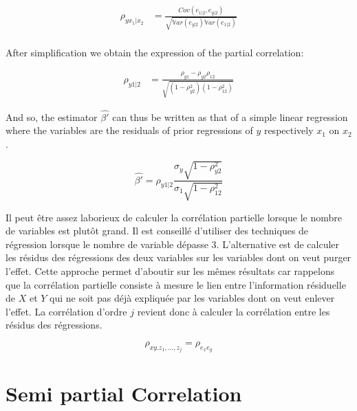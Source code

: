 \documentclass[
]{report}
\begin{document}
\begin{align*}
\rho_{yx_1|x_2}&=\frac{Cov(e_{1|2},e_{y|2})}{\sqrt{\mathbb{V}ar(e_{y|2})\mathbb{V}ar(e_{1|2})}}\\
\end{align*}

After simplification we obtain the expression of the partial correlation:

\begin{align*}
\rho_{y1|2}&=\frac{\rho_{y1}-\rho_{y2}\rho_{12}}{\sqrt{(1-\rho_{y2}^2)(1-\rho_{12}^2)}}
\end{align*}

And so, the estimator \(\hat{\beta'}\) can thus be written as that of a simple linear regression where the variables are the residuals of prior regressions of \(y\) respectively \(x_1\) on \(x_2\).

\[\hat{\beta'}=\rho_{y1|2}\frac{\sigma_y\sqrt{1-\rho_{y2}^2}}{\sigma_1\sqrt{1-\rho_{12}^2}}\]


Il peut être assez laborieux de calculer la corrélation partielle lorsque le nombre de variables est plutôt grand. Il est conseillé d'utiliser des techniques de régression lorsque le nombre de variable dépasse 3. L'alternative est de calculer les résidus des régressions des deux variables sur les variables dont on veut purger l'effet. Cette approche permet d'aboutir sur les mêmes résultats car rappelons que la corrélation partielle consiste à mesure le lien entre l'information résiduelle de \(X\) et \(Y\) qui ne soit pas déjà expliquée par les variables dont on veut enlever l'effet.
La corrélation d'ordre \(j\) revient donc à calculer la corrélation entre les résidus des régressions.

\[\rho_{xy.z_1, \ldots, z_j} = \rho_{e_xe_y}\]

\hypertarget{semi-partial-correlation}{%
\section{Semi partial Correlation}\label{semi-partial-correlation}}
\end{document}
